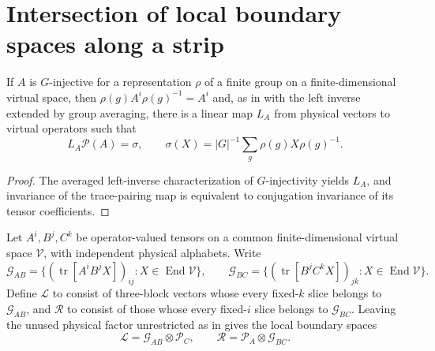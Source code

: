 \section{Intersection of local boundary spaces along a strip}%
\label{sec:peps_g_injective_strip_intersection}

\begin{lemma}%
    \label{lem:peps_mps_g_injective_averaged_left_inverse}
    \leanok
    If $A$ is $G$-injective for a representation $\rho$ of a finite
    group on a finite-dimensional virtual space, then
    $\rho(g)A^i\rho(g)^{-1}=A^i$ and, as in
    \cite[Definition~4.2 and Lemma~4.7]{Schuch2010PEPS} with the left
    inverse extended by group averaging, there is a linear map $L_A$
    from physical vectors to virtual operators such that
    \[
        L_A\mathcal P(A)=\sigma,\qquad
        \sigma(X)=|G|^{-1}\sum_g\rho(g)X\rho(g)^{-1}.
    \]
\end{lemma}

\begin{proof}\leanok
    The averaged left-inverse characterization of $G$-injectivity yields $L_A$,
    and invariance of the trace-pairing map is equivalent to conjugation
    invariance of its tensor coefficients.
\end{proof}

\begin{definition}%
    \label{def:peps_g_injective_strip_spaces}
    \leanok
    Let $A^i,B^j,C^k$ be operator-valued tensors on a common
    finite-dimensional virtual space $\mathcal V$, with independent
    physical alphabets. Write
    \[
        \mathcal G_{AB}
        =\{(\operatorname{tr}[A^iB^jX])_{ij}:X\in\operatorname{End}\mathcal V\},
        \qquad
        \mathcal G_{BC}
        =\{(\operatorname{tr}[B^jC^kX])_{jk}:X\in\operatorname{End}\mathcal V\}.
    \]
    Define $\mathcal L$ to consist of three-block vectors whose every
    fixed-$k$ slice belongs to $\mathcal G_{AB}$, and $\mathcal R$
    to consist of those whose every fixed-$i$ slice belongs to
    $\mathcal G_{BC}$. Leaving the unused physical factor unrestricted as in
    \cite[Theorem~4.8]{Schuch2010PEPS} gives the local boundary spaces
    \[
        \mathcal L=\mathcal G_{AB}\otimes\mathcal P_C,
        \qquad
        \mathcal R=\mathcal P_A\otimes\mathcal G_{BC}.
    \]
\end{definition}

